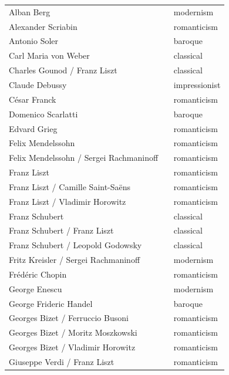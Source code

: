 \documentclass[a4paper]{book}
\begin{document}
\begin{center}
\begin{supertabular}{p{0.75\linewidth}|p{0.25\linewidth}}
Alban Berg & modernism \\ 
Alexander Scriabin & romanticism \\ 
Antonio Soler & baroque \\ 
Carl Maria von Weber & classical \\ 
Charles Gounod / Franz Liszt & classical \\ 
Claude Debussy & impressionist \\ 
César Franck & romanticism \\ 
Domenico Scarlatti & baroque \\ 
Edvard Grieg & romanticism \\ 
Felix Mendelssohn & romanticism \\ 
Felix Mendelssohn / Sergei Rachmaninoff & romanticism \\ 
Franz Liszt & romanticism \\ 
Franz Liszt / Camille Saint-Saëns & romanticism \\ 
Franz Liszt / Vladimir Horowitz & romanticism \\ 
Franz Schubert & classical \\ 
Franz Schubert / Franz Liszt & classical \\ 
Franz Schubert / Leopold Godowsky & classical \\ 
Fritz Kreisler / Sergei Rachmaninoff & modernism \\ 
Frédéric Chopin & romanticism \\ 
George Enescu & modernism \\ 
George Frideric Handel & baroque \\ 
Georges Bizet / Ferruccio Busoni & romanticism \\ 
Georges Bizet / Moritz Moszkowski & romanticism \\ 
Georges Bizet / Vladimir Horowitz & romanticism \\ 
Giuseppe Verdi / Franz Liszt & romanticism \\ 

\end{supertabular}
\end{center}
\end{document}
